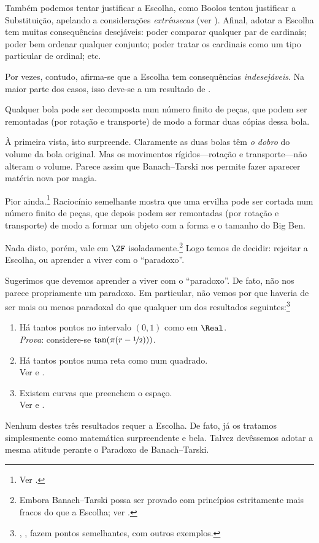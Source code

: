 \documentclass[../../../include/open-logic-section]{subfiles}
\begin{document}

Também podemos tentar justificar a Escolha, como Boolos tentou
justificar a Substituição, apelando a considerações \emph{extrínsecas}
(ver ). Afinal, adotar a Escolha
tem muitas consequências desejáveis: poder comparar qualquer
par de cardinais; poder bem ordenar qualquer conjunto; poder tratar
os cardinais como um tipo particular de ordinal; etc. 

Por vezes, contudo, afirma-se que a Escolha tem consequências \emph{indesejáveis}.
Na maior parte dos casos, isso deve-se a um resultado de
\cite{BanachTarski1924}. 

\begin{thm}
Qualquer bola pode ser decomposta num número finito de peças, que podem ser
remontadas (por rotação e transporte) de modo a formar duas cópias dessa
bola.
\end{thm}
\noindent 
À primeira vista, isto surpreende. Claramente as duas bolas têm
\emph{o dobro} do volume da bola original. Mas os movimentos rígidos---rotação e transporte---não alteram o volume. Parece assim que Banach--Tarski nos permite fazer aparecer matéria nova por magia.

Pior ainda.\footnote{Ver \citet[Theorem 3.12]{Wagon2016}.} Raciocínio semelhante mostra que uma ervilha pode ser cortada num número finito de peças,
que depois podem ser remontadas (por rotação e transporte) de modo a formar um
objeto com a forma e o tamanho do Big Ben.

Nada disto, porém, vale em $\ZF$ isoladamente.\footnote{Embora
Banach--Tarski possa ser provado com princípios estritamente mais fracos
do que a Escolha; ver \citet[303]{Wagon2016}.} Logo temos de decidir:
rejeitar a Escolha, ou aprender a viver com o ``paradoxo''. 

Sugerimos que devemos aprender a viver com o
``paradoxo''. De fato, não nos parece propriamente um paradoxo. Em
particular, não vemos por que haveria de ser mais ou menos paradoxal do que
qualquer um dos resultados seguintes:\footnote{\citet[276--7]{Potter2004},
\citet[16]{Weston2003}, \citet[31, 308--9]{Wagon2016} fazem
pontos semelhantes, com outros exemplos.}
\begin{enumerate}
	\item Há tantos pontos no intervalo $(0,1)$ como em $\Real$. 
	\\\emph{Prova}: considere-se $\tan(\pi(r-\nicefrac{1}{2})))$.
	\item Há tantos pontos numa reta como num quadrado.
	\\Ver {} e .
	\item Existem curvas que preenchem o espaço. 
	\\Ver {} e .
\end{enumerate}
Nenhum destes três resultados requer a Escolha. De fato, já os tratamos simplesmente como matemática surpreendente e bela. Talvez devêssemos adotar
a mesma atitude perante o Paradoxo de Banach--Tarski.
\end{document}
